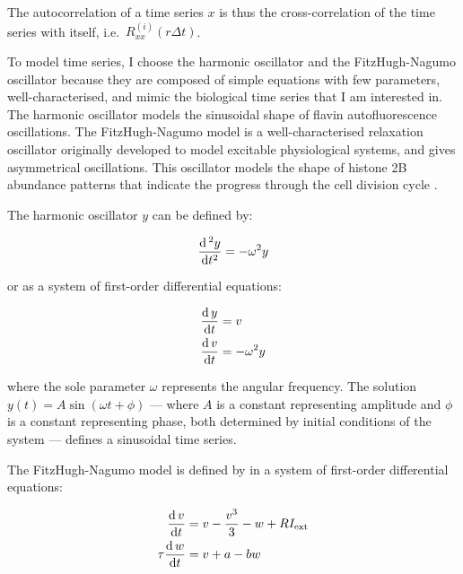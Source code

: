 The autocorrelation of a time series $x$ is thus the cross-correlation of the time series with itself, i.e.\ $R_{xx}^{(i)}(r \Delta t)$.

To model time series, I choose the harmonic oscillator and the FitzHugh-Nagumo oscillator because they are composed of simple equations with few parameters, well-characterised, and mimic the biological time series that I am interested in.
The harmonic oscillator models the sinusoidal shape of flavin autofluorescence oscillations.
The FitzHugh-Nagumo model \parencite{fitzhughImpulsesPhysiologicalStates1961} is a well-characterised relaxation oscillator originally developed to model excitable physiological systems, and gives asymmetrical oscillations.
This oscillator models the shape of histone 2B abundance patterns that indicate the progress through the cell division cycle \parencite{garmendia-torresMultipleInputsEnsure2018}.

The harmonic oscillator $y$ can be defined by:

\begin{equation}
  \frac{\mathrm{d} \,^{2} y}{\mathrm{d} t^{2}} = -\omega^{2}y
  \label{eq:harmonic}
\end{equation}

or as a system of first-order differential equations:

\begin{equation}
  \begin{aligned}
    \frac{\mathrm{d} \, y}{\mathrm{d} t} &= v \\
    \frac{\mathrm{d} \, v}{\mathrm{d} t} &= -\omega^{2}y
  \end{aligned}
  \label{eq:harmonic-1o}
\end{equation}

where the sole parameter $\omega$ represents the angular frequency.
The solution $y(t) = A \sin(\omega{}t + \phi)$ --- where $A$ is a constant representing amplitude and $\phi$ is a constant representing phase, both determined by initial conditions of the system --- defines a sinusoidal time series.

The FitzHugh-Nagumo model is defined by in a system of first-order differential equations:

\begin{equation}
  \begin{aligned}
    \frac{\mathrm{d} \, v}{\mathrm{d} t} &= v - \frac{v^3}{3} - w + RI_{\mathrm{ext}} \\
    \tau \frac{\mathrm{d} \, w}{\mathrm{d} t} &= v + a - bw
  \end{aligned}
  \label{eq:fhn}
\end{equation}

